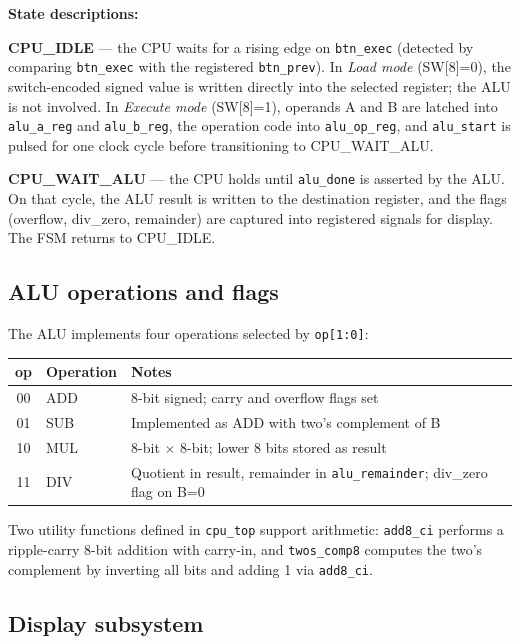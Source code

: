 \documentclass[11pt,a4paper]{article}
\begin{document}
\textbf{State descriptions:}

\textbf{CPU\_IDLE} — the CPU waits for a rising edge on \texttt{btn\_exec}
(detected by comparing \texttt{btn\_exec} with the registered
\texttt{btn\_prev}). In \emph{Load mode} (SW[8]=0), the switch-encoded signed
value is written directly into the selected register; the ALU is not involved.
In \emph{Execute mode} (SW[8]=1), operands A and B are latched into
\texttt{alu\_a\_reg} and \texttt{alu\_b\_reg}, the operation code into
\texttt{alu\_op\_reg}, and \texttt{alu\_start} is pulsed for one clock cycle
before transitioning to CPU\_WAIT\_ALU.

\textbf{CPU\_WAIT\_ALU} — the CPU holds until \texttt{alu\_done} is asserted
by the ALU. On that cycle, the ALU result is written to the destination
register, and the flags (overflow, div\_zero, remainder) are captured into
registered signals for display. The FSM returns to CPU\_IDLE.

\subsection{ALU operations and flags}

The ALU implements four operations selected by \texttt{op[1:0]}:

\begin{center}
\begin{tabular}{cll}
  \toprule
  \textbf{op} & \textbf{Operation} & \textbf{Notes} \\
  \midrule
  00 & ADD & 8-bit signed; carry and overflow flags set \\
  01 & SUB & Implemented as ADD with two's complement of B \\
  10 & MUL & 8-bit $\times$ 8-bit; lower 8 bits stored as result \\
  11 & DIV & Quotient in result, remainder in \texttt{alu\_remainder}; div\_zero flag on B=0 \\
  \bottomrule
\end{tabular}
\end{center}

Two utility functions defined in \texttt{cpu\_top} support arithmetic:
\texttt{add8\_ci} performs a ripple-carry 8-bit addition with carry-in, and
\texttt{twos\_comp8} computes the two's complement by inverting all bits and
adding 1 via \texttt{add8\_ci}.

\subsection{Display subsystem}
\end{document}
